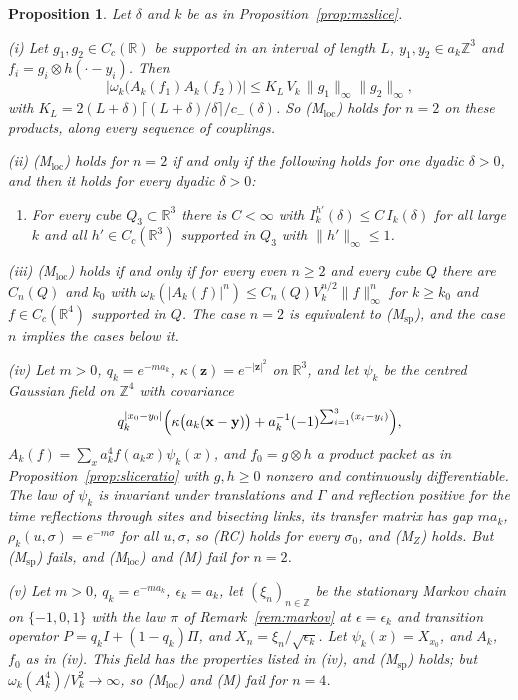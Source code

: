 \documentclass[aps,prd,twocolumn,superscriptaddress,nofootinbib,longbibliography,floatfix,amsmath,amssymb,10pt]{revtex4-2}
\newtheorem{proposition}[theorem]{Proposition}
\theoremstyle{definition}
\theoremstyle{remark}
\newcommand{\R}{\mathbb{R}}
\newcommand{\Z}{\mathbb{Z}}
\begin{document}
\begin{proposition}\label{prop:mlocslice}
Let $\delta$ and $k$ be as in Proposition~\textup{\ref{prop:mzslice}}.

\textup{(i)} Let $g_1,g_2\in C_c(\R)$ be supported in an interval of length
$L$, $y_1,y_2\in a_k\Z^3$ and $f_i=g_i\otimes h(\cdot-y_i)$. Then
\[
\bigl|\omega_k\bigl(A_k(f_1)A_k(f_2)\bigr)\bigr|\le K_L\,V_k\,
\|g_1\|_\infty\|g_2\|_\infty ,
\]
with $K_L=2(L+\delta)\lceil(L+\delta)/\delta\rceil/c_-(\delta)$. So
\textup{(M$_{\mathrm{loc}}$)} holds for $n=2$ on these products, along every
sequence of couplings.

\textup{(ii)} \textup{(M$_{\mathrm{loc}}$)} holds for $n=2$ if and only if
the following holds for one dyadic $\delta>0$, and then it holds for every
dyadic $\delta>0$:
\begin{enumerate}[label=\textup{(M$_{\mathrm{sp}}$)},leftmargin=*]
\item For every cube $Q_3\subset\R^3$ there is $C<\infty$ with
$I^{h'}_k(\delta)\le C\,I_k(\delta)$ for all large $k$ and all
$h'\in C_c(\R^3)$ supported in $Q_3$ with $\|h'\|_\infty\le1$.
\end{enumerate}

\textup{(iii)} \textup{(M$_{\mathrm{loc}}$)} holds if and only if for every
even $n\ge2$ and every cube $Q$ there are $C_n(Q)$ and $k_0$ with
$\omega_k(|A_k(f)|^n)\le C_n(Q)V_k^{n/2}\|f\|_\infty^n$ for $k\ge k_0$ and
$f\in C_c(\R^4)$ supported in $Q$. The case $n=2$ is equivalent to
\textup{(M$_{\mathrm{sp}}$)}, and the case $n$ implies the cases below it.

\textup{(iv)} Let $m>0$, $q_k=e^{-ma_k}$, $\kappa(\mathbf z)=e^{-|\mathbf
z|^2}$ on $\R^3$, and let $\psi_k$ be the centred Gaussian field on $\Z^4$
with covariance
\[
q_k^{|x_0-y_0|}\Bigl(\kappa\bigl(a_k(\mathbf x-\mathbf y)\bigr)+a_k^{-1}
(-1)^{\sum_{i=1}^3(x_i-y_i)}\Bigr),
\]
$A_k(f)=\sum_xa_k^4f(a_kx)\psi_k(x)$, and $f_0=g\otimes h$ a product packet as in
Proposition~\textup{\ref{prop:sliceratio}} with $g,h\ge0$ nonzero and
continuously differentiable. The law of $\psi_k$ is invariant
under translations and $\Gamma$ and reflection positive for the time
reflections through sites and bisecting links, its transfer matrix has gap
$ma_k$, $\rho_k(u,\sigma)=e^{-m\sigma}$ for all $u,\sigma$, so \textup{(RC)}
holds for every $\sigma_0$, and \textup{(M$_Z$)} holds. But
\textup{(M$_{\mathrm{sp}}$)} fails, and \textup{(M$_{\mathrm{loc}}$)} and
\textup{(M)} fail for $n=2$.

\textup{(v)} Let $m>0$, $q_k=e^{-ma_k}$, $\epsilon_k=a_k$, let
$(\xi_n)_{n\in\Z}$ be the stationary Markov chain on $\{-1,0,1\}$ with the
law $\pi$ of Remark~\textup{\ref{rem:markov}} at $\epsilon=\epsilon_k$ and
transition operator $P=q_kI+(1-q_k)\Pi$, and $X_n=\xi_n/\sqrt{\epsilon_k}$.
Let $\psi_k(x)=X_{x_0}$, and $A_k$, $f_0$ as in \textup{(iv)}. This field has the properties listed in \textup{(iv)}, and
\textup{(M$_{\mathrm{sp}}$)} holds; but $\omega_k(A_k^4)/V_k^2\to\infty$, so
\textup{(M$_{\mathrm{loc}}$)} and \textup{(M)} fail for $n=4$.
\end{proposition}
\end{document}
